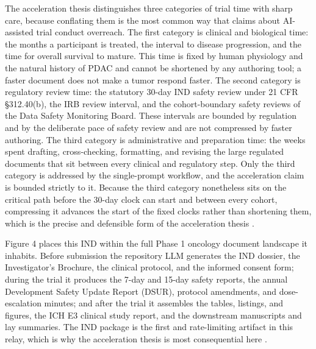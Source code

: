 The acceleration thesis distinguishes three categories of trial time with sharp
care, because conflating them is the most common way that claims about AI-assisted
trial conduct overreach. The first category is clinical and biological time: the
months a participant is treated, the interval to disease progression, and the time
for overall survival to mature. This time is fixed by human physiology and the
natural history of PDAC and cannot be shortened by any authoring tool; a faster
document does not make a tumor respond faster. The second category is regulatory
review time: the statutory 30-day IND safety review under 21 CFR \S 312.40(b), the
IRB review interval, and the cohort-boundary safety reviews of the Data Safety
Monitoring Board. These intervals are bounded by regulation and by the deliberate
pace of safety review and are not compressed by faster authoring. The third
category is administrative and preparation time: the weeks spent drafting,
cross-checking, formatting, and revising the large regulated documents that sit
between every clinical and regulatory step. Only the third category is addressed by
the single-prompt workflow, and the acceleration claim is bounded strictly to it.
Because the third category nonetheless sits on the critical path before the 30-day
clock can start and between every cohort, compressing it advances the start of the
fixed clocks rather than shortening them, which is the precise and defensible form
of the acceleration thesis \cite{oncotrialllm, paipredict4x}.

Figure 4 places this IND within the full Phase 1 oncology document landscape it
inhabits. Before submission the repository LLM generates the IND dossier, the
Investigator's Brochure, the clinical protocol, and the informed consent form;
during the trial it produces the 7-day and 15-day safety reports, the annual
Development Safety Update Report (DSUR), protocol amendments, and dose-escalation
minutes; and after the trial it assembles the tables, listings, and figures, the
ICH E3 clinical study report, and the downstream manuscripts and lay summaries. The
IND package is the first and rate-limiting artifact in this relay, which is why the
acceleration thesis is most consequential here \cite{oncotrialllm}.

